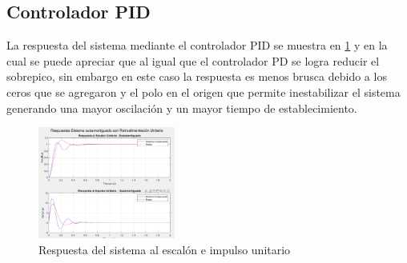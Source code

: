 \documentclass[conference]{IEEEtran}
\begin{document}
	\subsection{Controlador PID}
	La respuesta del sistema mediante el controlador PID se muestra en \ref{fig:respuesta-sistema-pid} y en la cual se puede apreciar que al igual que el controlador PD se logra reducir el sobrepico, sin embargo en este caso la respuesta es menos brusca debido a los ceros que se agregaron y el polo en el origen que permite inestabilizar el sistema generando una mayor oscilación y un mayor tiempo de establecimiento.
	\begin{figure}[h]
		\centering
		\includegraphics[width=0.4\textwidth]{media/respuesta-sistema-pid.png}
		\caption{Respuesta del sistema al escalón e impulso unitario}
		\label{fig:respuesta-sistema-pid}
	\end{figure}
	
	
\end{document}
